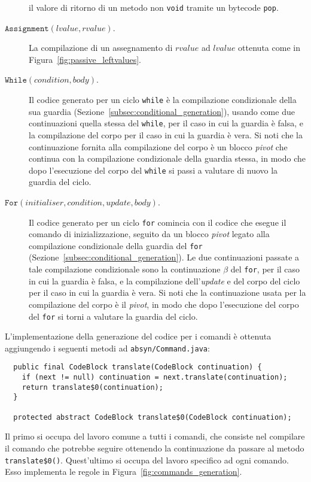 \begin{description}
  il valore di ritorno di un metodo non \texttt{void} tramite un
  bytecode \texttt{pop}.
\item[\underline{$\mathtt{Assignment(\mathit{lvalue},\mathit{rvalue})}$}.]
  La compilazione di un assegnamento di $\mathit{rvalue}$ ad
  $\mathit{lvalue}$ \e ottenuta come in Figura~\ref{fig:passive_leftvalues}.
\item[\underline{$\mathtt{While(\mathit{condition},\mathit{body})}$}.]
  Il codice generato per un ciclo \texttt{while} \`e la compilazione
  condizionale della sua guardia (Sezione~\ref{subsec:conditional_generation}),
  usando come due continuazioni quella stessa del \texttt{while}, per
  il caso in cui la guardia \`e falsa, e la compilazione del
  corpo per il caso in cui la guardia \`e vera. Si noti che la
  continuazione fornita alla compilazione del corpo \`e un blocco
  \textit{pivot}
  che continua con la compilazione condizionale della guardia stessa,
  in modo che dopo l'esecuzione del corpo del \texttt{while} si passi
  a valutare di nuovo la guardia del ciclo.
\item[\underline{$\mathtt{For(\mathit{initialiser},\mathit{condition},
  \mathit{update},\mathit{body})}$}.]
  Il codice generato per un ciclo \texttt{for} comincia con il codice
  che esegue il comando di inizializzazione, seguito da un blocco
  \textit{pivot} legato alla compilazione condizionale della guardia
  del \texttt{for} (Sezione~\ref{subsec:conditional_generation}).
  Le due continuazioni passate a tale compilazione condizionale sono
  la continuazione $\beta$ del \texttt{for}, per il caso in cui la
  guardia \`e falsa, e la compilazione dell'\textit{update} e del corpo
  del ciclo per il caso in cui la guardia \`e vera. Si noti che la
  continuazione usata per la compilazione del corpo \`e il \textit{pivot},
  in modo che dopo l'esecuzione del corpo del \texttt{for} si torni a valutare
  la guardia del ciclo.
\end{description}

L'implementazione della generazione del codice per i comandi \`e ottenuta
aggiungendo i seguenti metodi ad \texttt{absyn/Command.java}:
%
\begin{verbatim}
  public final CodeBlock translate(CodeBlock continuation) {
    if (next != null) continuation = next.translate(continuation);
    return translate$0(continuation);
  }

  protected abstract CodeBlock translate$0(CodeBlock continuation);
\end{verbatim}
%
Il primo si occupa del lavoro comune a tutti i comandi, che consiste
nel compilare il comando che potrebbe seguire ottenendo la continuazione
da passare al metodo \texttt{translate\$0()}.
Quest'ultimo si occupa del lavoro specifico ad ogni comando.
Esso implementa le regole in Figura~\ref{fig:commands_generation}.

